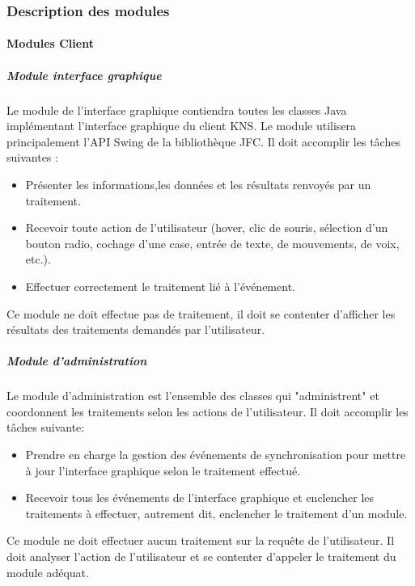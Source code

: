 \documentclass[10pt,a4paper]{report}
\begin{document}
		\subsubsection{Description des modules}
	
			\paragraph{Modules Client}

				\subparagraph{Module interface graphique}
				\begin{flushleft}
				Le module de l'interface graphique contiendra toutes les classes Java implémentant l'interface graphique du client KNS. Le module utilisera principalement l'API Swing de la bibliothèque JFC. Il doit  accomplir les tâches suivantes :\\
					
					\begin{itemize}
						\item Présenter les informations,les données et les résultats renvoyés par un traitement.
						\item Recevoir toute action de l'utilisateur (hover, clic de souris, sélection d'un bouton radio, cochage d'une case, entrée de texte, de mouvements, de voix, etc.).
						\item Effectuer correctement le traitement lié à l'événement. 
					\end{itemize}
					
					Ce module ne doit effectue pas de traitement, il doit se contenter d'afficher les résultats des traitements demandés par l'utilisateur.\\
				\end{flushleft}
						
				\subparagraph{Module d'administration}
				
				\begin{flushleft}
				Le module d'administration est l'ensemble des classes qui "administrent" et coordonnent les traitements selon les actions de l'utilisateur. Il doit accomplir les tâches suivante:
				
				\begin{itemize}
					\item Prendre en charge la gestion des événements de synchronisation pour mettre à jour l'interface graphique selon le traitement effectué. 
					\item Recevoir tous les événements de l'interface graphique et enclencher les traitements à effectuer, autrement dit, enclencher le traitement d'un module.
				\end{itemize}
				
Ce module ne doit effectuer aucun traitement sur la requête de l'utilisateur. Il doit analyser l'action de l'utilisateur et se contenter d'appeler le traitement du module adéquat.
				\end{flushleft}
				
\end{document}
